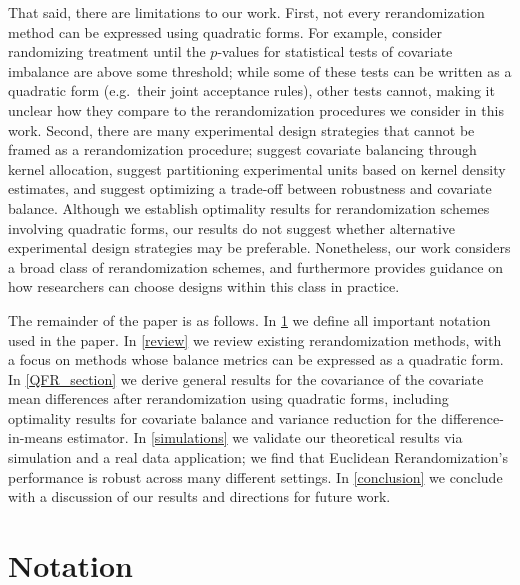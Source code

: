 \documentclass[11pt,twoside]{article}
\theoremstyle{definition}
\theoremstyle{remark}
\begin{document}
That said, there are limitations to our work. First, not every rerandomization method can be expressed using quadratic forms. For example, \cite{zhao2021no} consider randomizing treatment until the $p$-values for statistical tests of covariate imbalance are above some threshold; while some of these tests can be written as a quadratic form (e.g.\ their joint acceptance rules), other tests cannot, making it unclear how they compare to the rerandomization procedures we consider in this work. Second, there are many experimental design strategies that cannot be framed as a rerandomization procedure; \cite{kallus2018optimal} suggest covariate balancing through kernel allocation, \cite{li2021covariate} suggest partitioning experimental units based on kernel density estimates, and \cite{Harshaw01102024} suggest optimizing a trade-off between robustness and covariate balance. Although we establish optimality results for rerandomization schemes involving quadratic forms, our results do not suggest whether alternative experimental design strategies may be preferable. Nonetheless, our work considers a broad class of rerandomization schemes, and furthermore provides guidance on how researchers can choose designs within this class in practice. 

The remainder of the paper is as follows. In \cref{notation} we define all important notation used in the paper. In \cref{review} we review existing rerandomization methods, with a focus on methods whose balance metrics can be expressed as a quadratic form. In \cref{QFR_section} we derive general results for the covariance of the covariate mean differences after rerandomization using quadratic forms, including optimality results for covariate balance and variance reduction for the difference-in-means estimator. In \cref{simulations} we validate our theoretical results via simulation and a real data application; we find that Euclidean Rerandomization's performance is robust across many different settings. In \cref{conclusion} we conclude with a discussion of our results and directions for future work. 


\section{Notation} \label{notation}
\end{document}
